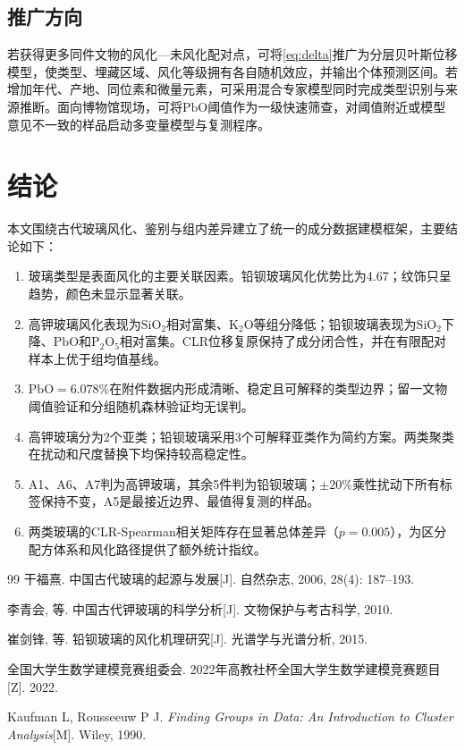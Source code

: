 \documentclass[UTF8,a4paper,zihao=-4,fontset=windows]{ctexart}
\begin{document}
\subsection{推广方向}

若获得更多同件文物的风化—未风化配对点，可将\cref{eq:delta}推广为分层贝叶斯位移模型，使类型、埋藏区域、风化等级拥有各自随机效应，并输出个体预测区间。若增加年代、产地、同位素和微量元素，可采用混合专家模型同时完成类型识别与来源推断。面向博物馆现场，可将$\mathrm{PbO}$阈值作为一级快速筛查，对阈值附近或模型意见不一致的样品启动多变量模型与复测程序。

\section{结论}

本文围绕古代玻璃风化、鉴别与组内差异建立了统一的成分数据建模框架，主要结论如下：

\begin{enumerate}
  \item 玻璃类型是表面风化的主要关联因素。铅钡玻璃风化优势比为4.67；纹饰只呈趋势，颜色未显示显著关联。
  \item 高钾玻璃风化表现为$\mathrm{SiO_2}$相对富集、$\mathrm{K_2O}$等组分降低；铅钡玻璃表现为$\mathrm{SiO_2}$下降、$\mathrm{PbO}$和$\mathrm{P_2O_5}$相对富集。CLR位移复原保持了成分闭合性，并在有限配对样本上优于组均值基线。
  \item $\mathrm{PbO}=6.078\%$在附件数据内形成清晰、稳定且可解释的类型边界；留一文物阈值验证和分组随机森林验证均无误判。
  \item 高钾玻璃分为2个亚类；铅钡玻璃采用3个可解释亚类作为简约方案。两类聚类在扰动和尺度替换下均保持较高稳定性。
  \item A1、A6、A7判为高钾玻璃，其余5件判为铅钡玻璃；$\pm20\%$乘性扰动下所有标签保持不变，A5是最接近边界、最值得复测的样品。
  \item 两类玻璃的CLR-Spearman相关矩阵存在显著总体差异（$p=0.005$），为区分配方体系和风化路径提供了额外统计指纹。
\end{enumerate}

\begin{thebibliography}{99}
干福熹. 中国古代玻璃的起源与发展[J]. 自然杂志, 2006, 28(4): 187--193.

李青会, 等. 中国古代钾玻璃的科学分析[J]. 文物保护与考古科学, 2010.

崔剑锋, 等. 铅钡玻璃的风化机理研究[J]. 光谱学与光谱分析, 2015.

全国大学生数学建模竞赛组委会. 2022年高教社杯全国大学生数学建模竞赛题目[Z]. 2022.

Kaufman L, Rousseeuw P J. \emph{Finding Groups in Data: An Introduction to Cluster Analysis}[M]. Wiley, 1990.
\end{thebibliography}
\end{document}
